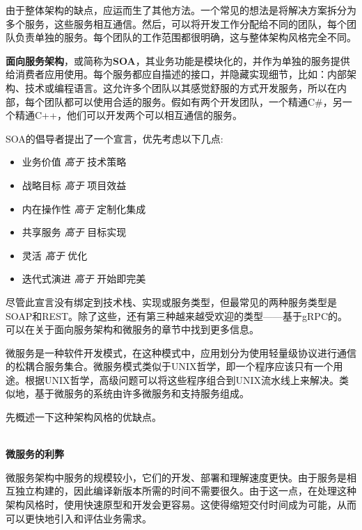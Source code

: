 
由于整体架构的缺点，应运而生了其他方法。一个常见的想法是将解决方案拆分为多个服务，这些服务相互通信。然后，可以将开发工作分配给不同的团队，每个团队负责单独的服务。每个团队的工作范围都很明确，这与整体架构风格完全不同。

\textbf{面向服务架构}，或简称为\textbf{SOA}，其业务功能是模块化的，并作为单独的服务提供给消费者应用使用。每个服务都应自描述的接口，并隐藏实现细节，比如：内部架构、技术或编程语言。这允许多个团队以其感觉舒服的方式开发服务，所以在内部，每个团队都可以使用合适的服务。假如有两个开发团队，一个精通C\#，另一个精通C++，他们可以开发两个可以相互通信的服务。

SOA的倡导者提出了一个宣言，优先考虑以下几点:

\begin{itemize}
\item
业务价值 \textit{高于} 技术策略

\item
战略目标 \textit{高于} 项目效益

\item
内在操作性 \textit{高于} 定制化集成

\item
共享服务 \textit{高于} 目标实现

\item
灵活 \textit{高于} 优化

\item
迭代式演进 \textit{高于} 开始即完美
\end{itemize}

尽管此宣言没有绑定到技术栈、实现或服务类型，但最常见的两种服务类型是SOAP和REST。除了这些，还有第三种越来越受欢迎的类型——基于gRPC的。可以在关于面向服务架构和微服务的章节中找到更多信息。


微服务是一种软件开发模式，在这种模式中，应用划分为使用轻量级协议进行通信的松耦合服务集合。微服务模式类似于UNIX哲学，即一个程序应该只有一个用途。根据UNIX哲学，高级问题可以将这些程序组合到UNIX流水线上来解决。类似地，基于微服务的系统由许多微服务和支持服务组成。

先概述一下这种架构风格的优缺点。

\hspace*{\fill} \\ %
\noindent
\textbf{微服务的利弊}

微服务架构中服务的规模较小，它们的开发、部署和理解速度更快。由于服务是相互独立构建的，因此编译新版本所需的时间不需要很久。由于这一点，在处理这种架构风格时，使用快速原型和开发会更容易。这使得缩短交付时间成为可能，从而可以更快地引入和评估业务需求。

